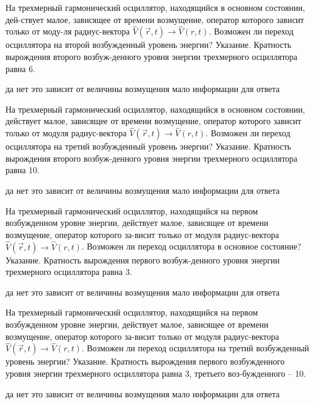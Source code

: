 \documentclass[11pt,a4paper]{exam}
\begin{document}
\begin{questions}
\question На трехмерный гармонический осциллятор, находящийся в основном состоянии, дей-ствует малое, зависящее от времени возмущение, оператор которого зависит только от моду-ля радиус-вектора $\hat V(\vec r,t) \to \hat V(r,t)$. Возможен ли переход осциллятора на второй возбужденный уровень энергии? Указание. Кратность вырождения второго возбуж-денного уровня энергии трехмерного осциллятора равна 6.
\begin{choices}
\choice да
\choice нет
\choice это зависит от величины возмущения
\choice мало информации для ответа
\end{choices}

\question  На трехмерный гармонический осциллятор, находящийся в основном состоянии, действует малое, зависящее от времени возмущение, оператор которого зависит только от модуля радиус-вектора $\hat V(\vec r,t) \to \hat V(r,t)$. Возможен ли переход осциллятора на третий возбужденный уровень энергии? Указание. Кратность вырождения второго возбуж-денного уровня энергии трехмерного осциллятора равна 10.
\begin{choices}
\choice да
\choice нет
\choice это зависит от величины возмущения
\choice мало информации для ответа
\end{choices}

\question На трехмерный гармонический осциллятор, находящийся на первом возбужденном уровне энергии, действует малое, зависящее от времени возмущение, оператор которого за-висит только от модуля радиус-вектора $\hat V(\vec r,t) \to \hat V(r,t)$. Возможен ли переход осциллятора в основное состояние? Указание. Кратность вырождения первого возбуж-денного уровня энергии трехмерного осциллятора равна 3.
\begin{choices}
\choice да
\choice нет
\choice это зависит от величины возмущения
\choice мало информации для ответа
\end{choices}

\question На трехмерный гармонический осциллятор, находящийся на первом возбужденном уровне энергии, действует малое, зависящее от времени возмущение, оператор которого за-висит только от модуля радиус-вектора $\hat V(\vec r,t) \to \hat V(r,t)$. Возможен ли переход осциллятора на третий возбужденный уровень энергии? Указание. Кратность вырождения первого возбужденного уровня энергии трехмерного осциллятора равна 3, третьего воз-бужденного – 10.
\begin{choices}
\choice да
\choice нет
\choice это зависит от величины возмущения
\choice мало информации для ответа
\end{choices}


\end{questions}
\end{document}
